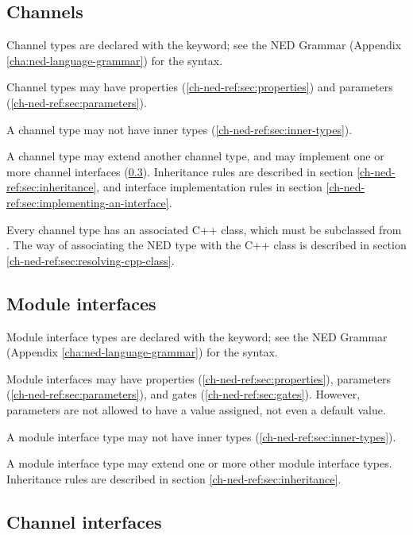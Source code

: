 \subsection{Channels}
\label{ch-ned-ref:sec:channels}

Channel types are declared with the  keyword;
see the NED Grammar (Appendix \ref{cha:ned-language-grammar}) for the
syntax.

Channel types may have properties (\ref{ch-ned-ref:sec:properties})
and parameters (\ref{ch-ned-ref:sec:parameters}).

A channel type may not have inner types (\ref{ch-ned-ref:sec:inner-types}).

A channel type may extend another channel type, and
may implement one or more channel interfaces (\ref{ch-ned-ref:sec:channel-interfaces}).
Inheritance rules are described in section \ref{ch-ned-ref:sec:inheritance},
and interface implementation rules in section \ref{ch-ned-ref:sec:implementing-an-interface}.

Every channel type has an associated C++ class, which must be
subclassed from . The way of associating the
NED type with the C++ class is described in section
\ref{ch-ned-ref:sec:resolving-cpp-class}.



\subsection{Module interfaces}
\label{ch-ned-ref:sec:module-interfaces}

Module interface types are declared with the  keyword;
see the NED Grammar (Appendix \ref{cha:ned-language-grammar}) for the
syntax.

Module interfaces may have properties (\ref{ch-ned-ref:sec:properties}),
parameters (\ref{ch-ned-ref:sec:parameters}), and
gates (\ref{ch-ned-ref:sec:gates}). However, parameters are not allowed
to have a value assigned, not even a default value.

A module interface type may not have inner types (\ref{ch-ned-ref:sec:inner-types}).

A module interface type may extend one or more other module interface types.
Inheritance rules are described in section \ref{ch-ned-ref:sec:inheritance}.



\subsection{Channel interfaces}
\label{ch-ned-ref:sec:channel-interfaces}

